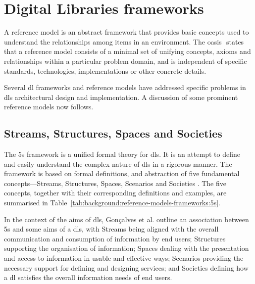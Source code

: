 \section[Frameworks]{Digital Libraries frameworks}
\label{sec:background:reference-models-frameworks}

A reference model is an abstract framework that provides basic concepts used to understand the relationships among items in an environment. The \gls{oasis} \citep{MacKenzie2006}⁠ states that a reference model consists of a minimal set of unifying concepts, axioms and relationships within a particular problem domain, and is independent of specific standards, technologies, implementations or other concrete details.

Several \gls{dl} frameworks \citep{Gonccalves2004,Kahn2006} and reference models \citep{Candela2007a} have addressed specific problems in \gls{dls} architectural design and implementation. A discussion of some prominent reference models now follows.

%
%
%
\subsection[5S framework]{Streams, Structures, Spaces and Societies}
\label{sec:background:reference-models-frameworks:5s}

The \gls{5s} framework is a unified formal theory for \glspl{dl}. It is an attempt to define and easily understand the complex nature of \glspl{dl} in a rigorous manner. The framework is based on formal definitions, and abstraction of five fundamental concepts---Streams, Structures, Spaces, Scenarios and Societies \citep{Gonccalves2004}⁠.  The five concepts, together with their corresponding definitions and examples, are summarised in Table~\ref{tab:background:reference-models-frameworks:5s}.

\tablespacing

\bodyspacing

In the context of the aims of \glspl{dl}, Gon\c{c}alves et al. \citep{Gonccalves2004} outline an association between \gls{5s} and some aims of a \gls{dls}, with Streams being aligned with the overall communication and consumption of information by end users; Structures supporting the organisation of information; Spaces dealing with the presentation and access to information in usable and effective ways; Scenarios providing the necessary support for defining and designing services; and Societies defining how a \gls{dl} satisfies the overall information needs of end users.


